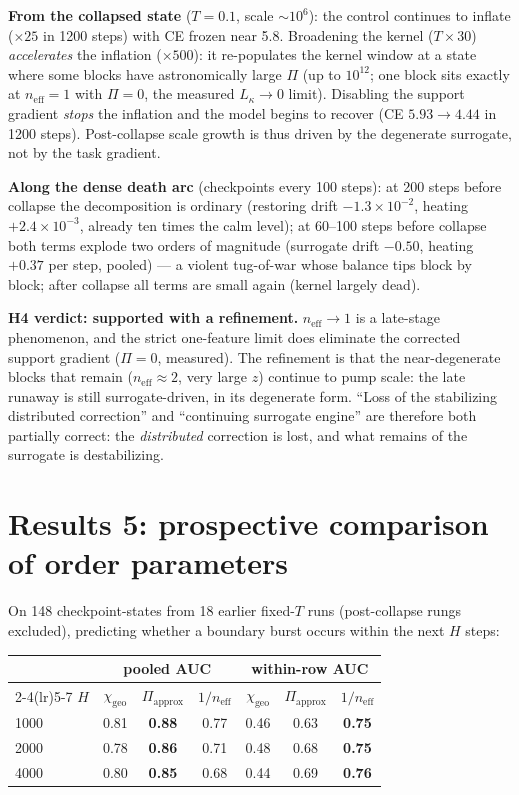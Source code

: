 \documentclass[11pt,a4paper]{article}
\newcommand{\neff}{n_{\mathrm{eff}}}
\newcommand{\chigeo}{\chi_{\mathrm{geo}}}
\newcommand{\Pisurr}{\Pi}
\begin{document}
\textbf{From the collapsed state} (\(T{=}0.1\), scale \(\sim10^6\)): the
control continues to inflate (\(\times25\) in 1200 steps) with CE frozen
near 5.8. Broadening the kernel (\(T\times30\)) \emph{accelerates} the
inflation (\(\times500\)): it re-populates the kernel window at a state
where some blocks have astronomically large \(\Pisurr\) (up to \(10^{12}\);
one block sits exactly at \(\neff = 1\) with \(\Pisurr = 0\), the measured
\(L_\kappa \to 0\) limit). Disabling the support gradient \emph{stops} the
inflation and the model begins to recover (CE \(5.93 \to 4.44\) in 1200
steps). Post-collapse scale growth is thus driven by the degenerate
surrogate, not by the task gradient.

\textbf{Along the dense death arc} (checkpoints every 100 steps): at 200
steps before collapse the decomposition is ordinary (restoring drift
\(-1.3\times10^{-2}\), heating \(+2.4\times10^{-3}\), already ten times the
calm level); at 60--100 steps before collapse both terms explode two orders
of magnitude (surrogate drift \(-0.50\), heating \(+0.37\) per step,
pooled) --- a violent tug-of-war whose balance tips block by block; after
collapse all terms are small again (kernel largely dead).

\textbf{H4 verdict: supported with a refinement.} \(\neff \to 1\) is a
late-stage phenomenon, and the strict one-feature limit does eliminate the
corrected support gradient (\(\Pisurr = 0\), measured). The refinement is
that the near-degenerate blocks that remain (\(\neff \approx 2\), very
large \(z\)) continue to pump scale: the late runaway is still
surrogate-driven, in its degenerate form. ``Loss of the stabilizing
distributed correction'' and ``continuing surrogate engine'' are therefore
both partially correct: the \emph{distributed} correction is lost, and what
remains of the surrogate is destabilizing.


\section{Results 5: prospective comparison of order parameters}

On 148 checkpoint-states from 18 earlier fixed-\(T\) runs (post-collapse
rungs excluded), predicting whether a boundary burst occurs within the next
\(H\) steps:

\begin{center}\small
\begin{tabular}{lcccccc}
\toprule
& \multicolumn{3}{c}{pooled AUC} & \multicolumn{3}{c}{within-row AUC} \\
\cmidrule(lr){2-4}\cmidrule(lr){5-7}
\(H\) & \(\chigeo\) & \(\Pi_{\mathrm{approx}}\) & \(1/\neff\)
      & \(\chigeo\) & \(\Pi_{\mathrm{approx}}\) & \(1/\neff\) \\
\midrule
1000 & 0.81 & \textbf{0.88} & 0.77 & 0.46 & 0.63 & \textbf{0.75} \\
2000 & 0.78 & \textbf{0.86} & 0.71 & 0.48 & 0.68 & \textbf{0.75} \\
4000 & 0.80 & \textbf{0.85} & 0.68 & 0.44 & 0.69 & \textbf{0.76} \\
\bottomrule
\end{tabular}
\end{center}
\end{document}
